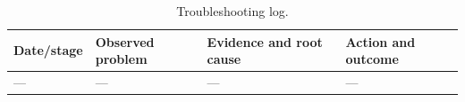 \begin{table}[!htbp]
\centering
\caption{Troubleshooting log.}
\label{tab:troubleshooting}
\begin{tabularx}{\textwidth}{@{}p{2.2cm}XXX@{}}
\toprule
\textbf{Date/stage} & \textbf{Observed problem} & \textbf{Evidence and root cause} & \textbf{Action and outcome} \\
\midrule
--- & --- & --- & --- \\
\bottomrule
\end{tabularx}
\end{table}

\noindent{}
